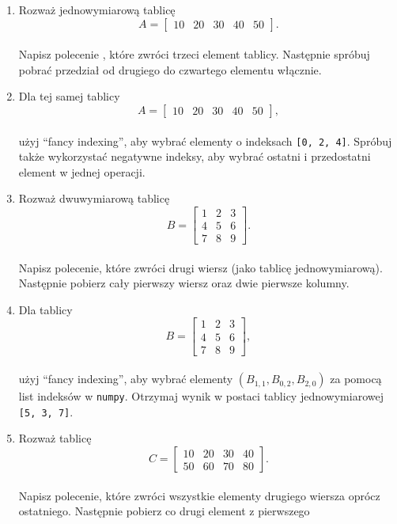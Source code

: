 \documentclass[
  letterpaper,
  DIV=11,
  numbers=noendperiod]{scrreprt}
\begin{document}
\begin{enumerate}
\def\labelenumi{\arabic{enumi}.}
\item
  Rozważ jednowymiarową tablicę\\
  \[A = \begin{bmatrix}10 & 20 & 30 & 40 & 50\end{bmatrix}.\]\\
  Napisz polecenie , które zwróci trzeci element tablicy. Następnie
  spróbuj pobrać przedział od drugiego do czwartego elementu włącznie.
\item
  Dla tej samej tablicy\\
  \[A = \begin{bmatrix}10 & 20 & 30 & 40 & 50\end{bmatrix},\]\\
  użyj ``fancy indexing'', aby wybrać elementy o indeksach
  \texttt{{[}0,\ 2,\ 4{]}}. Spróbuj także wykorzystać negatywne indeksy,
  aby wybrać ostatni i przedostatni element w jednej operacji.
\item
  Rozważ dwuwymiarową tablicę\\
  \[B = \begin{bmatrix}1 & 2 & 3 \\ 4 & 5 & 6 \\ 7 & 8 & 9\end{bmatrix}.\]\\
  Napisz polecenie, które zwróci drugi wiersz (jako tablicę
  jednowymiarową). Następnie pobierz cały pierwszy wiersz oraz dwie
  pierwsze kolumny.
\item
  Dla tablicy\\
  \[B = \begin{bmatrix}1 & 2 & 3 \\ 4 & 5 & 6 \\ 7 & 8 & 9\end{bmatrix},\]\\
  użyj ``fancy indexing'', aby wybrać elementy
  \((B_{1,1}, B_{0,2}, B_{2,0})\) za pomocą list indeksów w
  \texttt{numpy}. Otrzymaj wynik w postaci tablicy jednowymiarowej
  \texttt{{[}5,\ 3,\ 7{]}}.
\item
  Rozważ tablicę\\
  \[C = \begin{bmatrix}10 & 20 & 30 & 40 \\ 50 & 60 & 70 & 80\end{bmatrix}.\]\\
  Napisz polecenie, które zwróci wszystkie elementy drugiego wiersza
  oprócz ostatniego. Następnie pobierz co drugi element z pierwszego

\end{enumerate}
\end{document}
